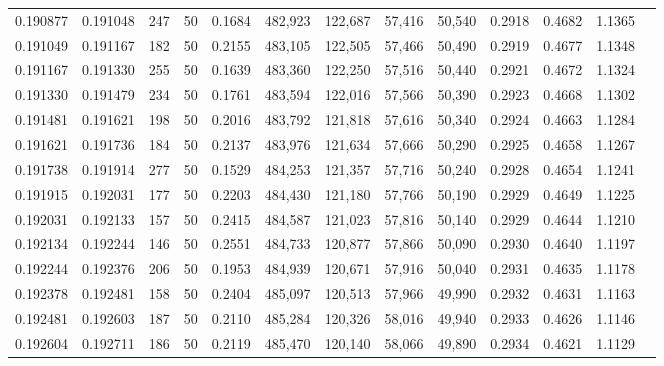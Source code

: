 \begin{tabular}{rrrrrrrrrrrrr}
0.190877 & 0.191048 &   247 &  50 &                                     0.1684 & 482,923 & 122,687 &  57,416 &  50,540 & 0.2918 & 0.4682 & 1.1365 \\
0.191049 & 0.191167 &   182 &  50 &                                     0.2155 & 483,105 & 122,505 &  57,466 &  50,490 & 0.2919 & 0.4677 & 1.1348 \\
0.191167 & 0.191330 &   255 &  50 &                                     0.1639 & 483,360 & 122,250 &  57,516 &  50,440 & 0.2921 & 0.4672 & 1.1324 \\
0.191330 & 0.191479 &   234 &  50 &                                     0.1761 & 483,594 & 122,016 &  57,566 &  50,390 & 0.2923 & 0.4668 & 1.1302 \\
0.191481 & 0.191621 &   198 &  50 &                                     0.2016 & 483,792 & 121,818 &  57,616 &  50,340 & 0.2924 & 0.4663 & 1.1284 \\
0.191621 & 0.191736 &   184 &  50 &                                     0.2137 & 483,976 & 121,634 &  57,666 &  50,290 & 0.2925 & 0.4658 & 1.1267 \\
0.191738 & 0.191914 &   277 &  50 &                                     0.1529 & 484,253 & 121,357 &  57,716 &  50,240 & 0.2928 & 0.4654 & 1.1241 \\
0.191915 & 0.192031 &   177 &  50 &                                     0.2203 & 484,430 & 121,180 &  57,766 &  50,190 & 0.2929 & 0.4649 & 1.1225 \\
0.192031 & 0.192133 &   157 &  50 &                                     0.2415 & 484,587 & 121,023 &  57,816 &  50,140 & 0.2929 & 0.4644 & 1.1210 \\
0.192134 & 0.192244 &   146 &  50 &                                     0.2551 & 484,733 & 120,877 &  57,866 &  50,090 & 0.2930 & 0.4640 & 1.1197 \\
0.192244 & 0.192376 &   206 &  50 &                                     0.1953 & 484,939 & 120,671 &  57,916 &  50,040 & 0.2931 & 0.4635 & 1.1178 \\
0.192378 & 0.192481 &   158 &  50 &                                     0.2404 & 485,097 & 120,513 &  57,966 &  49,990 & 0.2932 & 0.4631 & 1.1163 \\
0.192481 & 0.192603 &   187 &  50 &                                     0.2110 & 485,284 & 120,326 &  58,016 &  49,940 & 0.2933 & 0.4626 & 1.1146 \\
0.192604 & 0.192711 &   186 &  50 &                                     0.2119 & 485,470 & 120,140 &  58,066 &  49,890 & 0.2934 & 0.4621 & 1.1129 \\

\end{tabular}
